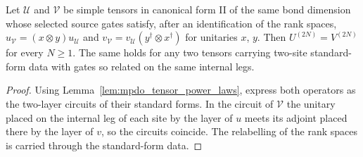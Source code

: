 \begin{lemma}
    \label{thm:mpu_fundamental_gates_sufficiency}
    \leanok
    Let $\mathcal U$ and $\mathcal V$ be simple tensors in canonical form II
    of the same bond dimension whose selected source gates satisfy, after an
    identification of the rank spaces, $u_{\mathcal V}=(x\otimes y)u_{\mathcal U}$
    and $v_{\mathcal V}=v_{\mathcal U}(y^\dagger\otimes x^\dagger)$ for
    unitaries $x$, $y$. Then $U^{(2N)}=V^{(2N)}$ for every $N\ge1$. The same
    holds for any two tensors carrying two-site standard-form data with gates
    so related on the same internal legs.
\end{lemma}
\begin{proof}\leanok
    Using Lemma~\ref{lem:mpdo_tensor_power_laws}, express both operators as
    the two-layer circuits of their standard forms. In the circuit of
    $\mathcal V$ the unitary placed on the internal leg of
    each site by the layer of $u$ meets its adjoint placed there by the layer
    of $v$, so the circuits coincide. The relabelling of the rank spaces is
    carried through the standard-form data.
\end{proof}

